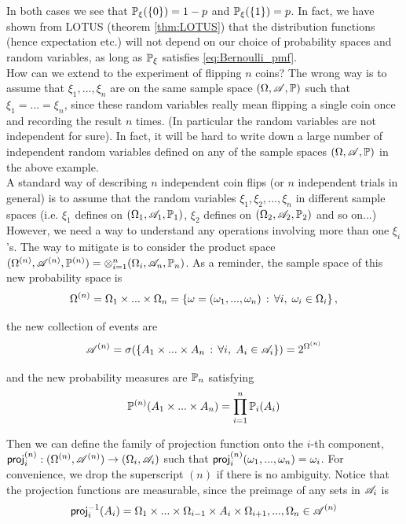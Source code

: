 In both cases we see that $\mathbb{P}_\xi(\left\{ 0 \right \}) = 1-p$ and $\mathbb{P}_\xi(\left\{ 1 \right \}) = p$. In fact, we have shown from LOTUS (theorem \ref{thm:LOTUS}) that the distribution functions (hence expectation etc.) will not depend on our choice of probability spaces and random variables, as long as $\mathbb{P}_\xi$ satisfies \eqref{eq:Bernoulli_pmf}.\\

How can we extend to the experiment of flipping $n$ coins? The wrong way is to assume that $\xi_1, ..., \xi_n$ are on the same sample space $(\Omega, \mathcal{A}, \mathbb{P})$ such that $\xi_1= ...= \xi_n$, since these random variables really mean flipping a single coin once and recording the result $n$ times. (In particular the random variables are not independent for sure). In fact, it will be hard to write down a large number of independent random variables defined on any of the sample spaces $(\Omega, \mathcal{A}, \mathbb{P})$ in the above example. \\

A standard way of describing $n$ independent coin flips (or $n$ independent trials in general) is to assume that the random variables $\xi_1, \xi_2, ..., \xi_n$ in different sample spaces (i.e. $\xi_1$ defines on $(\Omega_1, \mathcal{A}_1, \mathbb{P}_1)$, $\xi_2$ defines on $(\Omega_2, \mathcal{A}_2, \mathbb{P}_2)$ and so on...) However, we need a way to understand any operations involving more than one $\xi_i$'s. The way to mitigate is to consider the product space $(\Omega^{(n)}, \mathcal{A}^{(n)}, \mathbb{P}^{(n)}) = \otimes_{i=1}^n (\Omega_i, \mathcal{A}_n, \mathbb{P}_n)$. As a reminder, the sample space of this new probability space is 
\begin{equation*}
    \Omega^{(n)} = \Omega_1 \times ... \times \Omega_n = \left\{ \omega = (\omega_1,...,\omega_n) \,:\, \forall i, \; \omega_i \in \Omega_i \right \},
\end{equation*}

the new collection of events are
\begin{equation*}
    \mathcal{A}^{(n)} = \sigma(\left\{ A_1 \times ... \times A_n \,:\, \forall i, \; A_i \in \mathcal{A}_i \right \}) = 2^{\Omega^{(n)}}
\end{equation*}

and the new probability measures are $\mathbb{P}_n$ satisfying 
\begin{equation*}
    \mathbb{P}^{(n)}(A_1 \times ... \times A_n) = \prod_{i=1}^n \mathbb{P}_i(A_i)
\end{equation*}

Then we can define the family of projection function onto the $i$-th component,  $\mathsf{proj}^{(n)}_i: (\Omega^{(n)},\mathcal{A}^{(n)}) \to (\Omega_i, \mathcal{A}_i)$ such that $\mathsf{proj}^{(n)}_i(\omega_1, ..., \omega_n) = \omega_i$. For convenience, we drop the superscript $(n)$ if there is no ambiguity. Notice that the projection functions are measurable, since the preimage of any sets in $\mathcal{A}_i$ is 
$$\mathsf{proj}_i^{-1}(A_i) = \Omega_1 \times ... \times \Omega_{i-1} \times A_i \times \Omega_{i+1}, ..., \Omega_n \in \mathcal{A}^{(n)}$$

